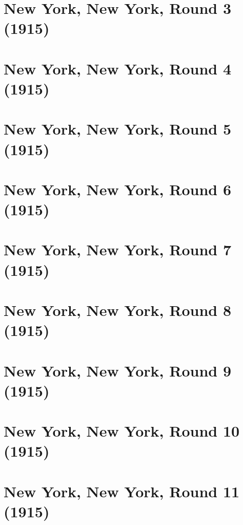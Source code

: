 \documentclass[11pt]{article}
\begin{document}
\section{New York, New York, Round 3 (1915)}


\clearpage

\section{New York, New York, Round 4 (1915)}


\clearpage

\section{New York, New York, Round 5 (1915)}


\clearpage

\section{New York, New York, Round 6 (1915)}


\clearpage

\section{New York, New York, Round 7 (1915)}


\clearpage

\section{New York, New York, Round 8 (1915)}


\clearpage

\section{New York, New York, Round 9 (1915)}


\clearpage

\section{New York, New York, Round 10 (1915)}


\clearpage

\section{New York, New York, Round 11 (1915)}

\end{document}
